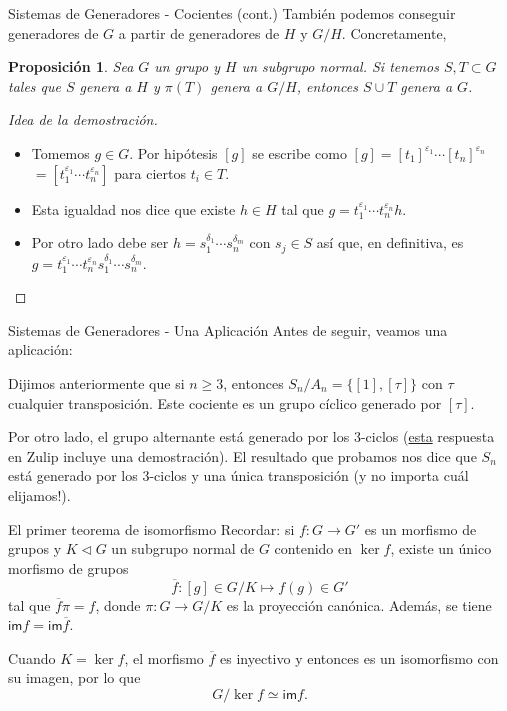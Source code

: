 \documentclass{beamer}
\newtheorem{proposicion}[teorema]{Proposici\'on}
\begin{document}
\begin{frame}{Sistemas de Generadores - Cocientes (cont.)}
También podemos conseguir generadores de $G$ a partir de generadores de $H$ y $G/H$. Concretamente,
 \begin{proposicion} Sea $G$ un grupo y $H$ un subgrupo normal. Si tenemos $S,T \subset G$ tales que $S$ genera a $H$ y $\pi(T)$ genera a $G/H$, entonces $S \cup T$ genera a $G$.
\end{proposicion}
 \begin{proof}[Idea de la demostración]
\begin{itemize}
 \item Tomemos $g \in G$. Por hipótesis $[g]$ se escribe como $[g] = [t_1]^{\varepsilon_1} \cdots [t_n]^{\varepsilon_n}$ $= [t_1^{\varepsilon_1} \cdots t_n^{\varepsilon_n}]$ para ciertos $t_i \in T$.
 \item Esta igualdad nos dice que existe $h \in H$ tal que $g = t_1^{\varepsilon_1} \cdots t_n^{\varepsilon_n}h$.
 \item Por otro lado debe ser $h = s_1^{\delta_1} \cdots s_n^{\delta_m}$ con $s_j \in S$ así que, en definitiva, es $g = t_1^{\varepsilon_1} \cdots t_n^{\varepsilon_n}s_1^{\delta_1} \cdots s_n^{\delta_m}$.
\end{itemize}  
\end{proof}
\end{frame}

\begin{frame}{Sistemas de Generadores - Una Aplicación}
Antes de seguir, veamos una aplicación:

\medskip

 Dijimos anteriormente que si $n \geq 3$, entonces $S_n/A_n = \{[1],[\tau]\}$ con $\tau$ cualquier transposición. Este cociente es un grupo cíclico generado por $[\tau]$. 

\medskip

Por otro lado, el grupo alternante está generado por los $3$-ciclos (\href{https://bit.ly/3cONlKe}{\alert{esta}} respuesta en Zulip incluye una demostración). El resultado que probamos nos dice que $S_n$ está generado por los $3$-ciclos y una única transposición (y no importa cuál elijamos!).

\medskip
\end{frame}

\begin{frame}{El primer teorema de isomorfismo}
\alert{Recordar:} si $f : G \to G'$ es un morfismo de grupos y $K \triangleleft G$ un subgrupo normal de $G$ contenido en $\ker f$, existe un único morfismo de grupos 
\[
\overline{f} : [g] \in G/K \mapsto f(g) \in G'
\]
tal que $\overline{f}\pi = f$, donde $\pi: G \to G/K$ es la proyección canónica. Además, se tiene $\mathsf{im} f = \mathsf{im} \overline{f}$. 
\medskip

 Cuando $K = \ker f$, el morfismo $\overline{f}$ es inyectivo y entonces es un isomorfismo con su imagen, por lo que
\[
G/\ker f \simeq \mathsf{im} f.
\]
\end{frame}  
\end{document}
